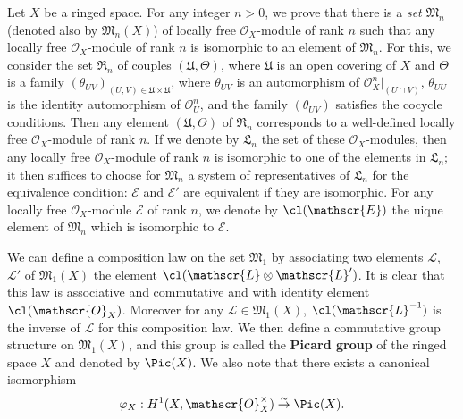 Let $X$ be a ringed space. For any integer $n>0$, we prove that there is a \textit{set} $\mathfrak{M}_n$ (denoted also by $\mathfrak{M}_n(X)$) of locally free $\mathscr{O}_X$-module of rank $n$ such that any locally free $\mathscr{O}_X$-module of rank $n$ is isomorphic to an element of $\mathfrak{M}_n$. For this, we consider the set $\mathfrak{R}_n$ of couples $(\mathfrak{U},\Theta)$, where $\mathfrak{U}$ is an open covering of $X$ and $\Theta$ is a family $(\theta_{UV})_{(U,V)\in\mathfrak{U}\times\mathfrak{U}}$, where $\theta_{UV}$ is an automorphism of $\mathscr{O}_X^n|_{(U\cap V)}$, $\theta_{UU}$ is the identity automorphism of $\mathscr{O}_U^n$, and the family $(\theta_{UV})$ satisfies the cocycle conditions. Then any element $(\mathfrak{U},\Theta)$ of $\mathfrak{R}_n$ corresponds to a well-defined locally free $\mathscr{O}_X$-module of rank $n$. If we denote by $\mathfrak{L}_n$ the set of these $\mathscr{O}_X$-modules, then any locally free $\mathscr{O}_X$-module of rank $n$ is isomorphic to one of the elements in $\mathfrak{L}_n$; it then suffices to choose for $\mathfrak{M}_n$ a system of representatives of $\mathfrak{L}_n$ for the equivalence condition: $\mathscr{E}$ and $\mathscr{E}'$ are equivalent if they are isomorphic. For any locally free $\mathscr{O}_X$-module $\mathscr{E}$ of rank $n$, we denote by $\cl(\mathscr{E})$ the uique element of $\mathfrak{M}_n$ which is isomorphic to $\mathscr{E}$.\par
We can define a composition law on the set $\mathfrak{M}_1$ by associating two elements $\mathscr{L}$, $\mathscr{L}'$ of $\mathfrak{M}_1(X)$ the element $\cl(\mathscr{L}\otimes\mathscr{L}')$. It is clear that this law is associative and commutative and with identity element $\cl(\mathscr{O}_X)$. Moreover for any $\mathscr{L}\in\mathfrak{M}_1(X)$, $\cl(\mathscr{L}^{-1})$ is the inverse of $\mathscr{L}$ for this composition law. We then define a commutative group structure on $\mathfrak{M}_1(X)$, and this group is called the \textbf{Picard group} of the ringed space $X$ and denoted by $\Pic(X)$. We also note that there exists a canonical isomorphism
\[\varphi_X:H^1(X,\mathscr{O}_X^{\times})\stackrel{\sim}{\to}\Pic(X).\]
